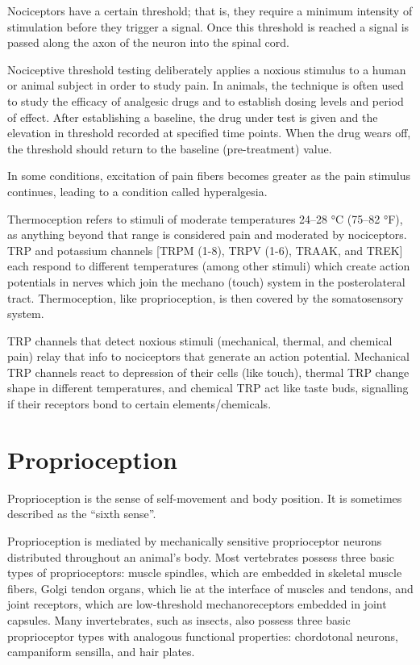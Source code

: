 Nociceptors have a certain threshold; that is, they require a minimum intensity of stimulation before they trigger a signal. Once this threshold is reached a signal is passed along the axon of the neuron into the spinal cord.

Nociceptive threshold testing deliberately applies a noxious stimulus to a human or animal subject in order to study pain. In animals, the technique is often used to study the efficacy of analgesic drugs and to establish dosing levels and period of effect. After establishing a baseline, the drug under test is given and the elevation in threshold recorded at specified time points. When the drug wears off, the threshold should return to the baseline (pre-treatment) value.

In some conditions, excitation of pain fibers becomes greater as the pain stimulus continues, leading to a condition called hyperalgesia.

Thermoception refers to stimuli of moderate temperatures 24--28 °C (75--82 °F), as anything beyond that range is considered pain and moderated by nociceptors. TRP and potassium channels {[}TRPM (1-8), TRPV (1-6), TRAAK, and TREK{]} each respond to different temperatures (among other stimuli) which create action potentials in nerves which join the mechano (touch) system in the posterolateral tract. Thermoception, like proprioception, is then covered by the somatosensory system.

TRP channels that detect noxious stimuli (mechanical, thermal, and chemical pain) relay that info to nociceptors that generate an action potential. Mechanical TRP channels react to depression of their cells (like touch), thermal TRP change shape in different temperatures, and chemical TRP act like taste buds, signalling if their receptors bond to certain elements/chemicals.

\hypertarget{proprioception}{%
\section{Proprioception}\label{proprioception}}

Proprioception is the sense of self-movement and body position. It is sometimes described as the ``sixth sense''.

Proprioception is mediated by mechanically sensitive proprioceptor neurons distributed throughout an animal's body. Most vertebrates possess three basic types of proprioceptors: muscle spindles, which are embedded in skeletal muscle fibers, Golgi tendon organs, which lie at the interface of muscles and tendons, and joint receptors, which are low-threshold mechanoreceptors embedded in joint capsules. Many invertebrates, such as insects, also possess three basic proprioceptor types with analogous functional properties: chordotonal neurons, campaniform sensilla, and hair plates.

